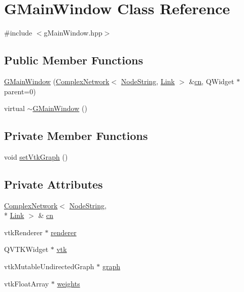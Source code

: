 \hypertarget{class_g_main_window}{\section{G\+Main\+Window Class Reference}
\label{class_g_main_window}
}


{\ttfamily \#include $<$g\+Main\+Window.\+hpp$>$}

\subsection*{Public Member Functions}
\begin{DoxyCompactItemize}
\item 
\hyperlink{class_g_main_window_af189560e487bad8c776083ab79c4b29f}{G\+Main\+Window} (\hyperlink{class_complex_network}{Complex\+Network}$<$ \hyperlink{class_node_string}{Node\+String}, \hyperlink{class_link}{Link} $>$ \&\hyperlink{class_g_main_window_aa5824bd346a8a612ed3792a6ce7faf50}{cn}, Q\+Widget $\ast$parent=0)
\item 
virtual \hyperlink{class_g_main_window_a828128107557ff68eb709fd416b77cb2}{$\sim$\+G\+Main\+Window} ()
\end{DoxyCompactItemize}
\subsection*{Private Member Functions}
\begin{DoxyCompactItemize}
\item 
void \hyperlink{class_g_main_window_a464bcf8c3f6ec788398c275ff4bd800d}{set\+Vtk\+Graph} ()
\end{DoxyCompactItemize}
\subsection*{Private Attributes}
\begin{DoxyCompactItemize}
\item 
\hyperlink{class_complex_network}{Complex\+Network}$<$ \hyperlink{class_node_string}{Node\+String}, \\*
\hyperlink{class_link}{Link} $>$ \& \hyperlink{class_g_main_window_aa5824bd346a8a612ed3792a6ce7faf50}{cn}
\item 
vtk\+Renderer $\ast$ \hyperlink{class_g_main_window_a691d66ce40f6c4782519f50be5e70654}{renderer}
\item 
Q\+V\+T\+K\+Widget $\ast$ \hyperlink{class_g_main_window_a0133dd3a1b89e887ede8aec262844914}{vtk}
\item 
vtk\+Mutable\+Undirected\+Graph $\ast$ \hyperlink{class_g_main_window_ab97c0cde05fda7d301306e82daaeab57}{graph}
\item 
vtk\+Float\+Array $\ast$ \hyperlink{class_g_main_window_a90fc9b6fbd1838ac294c5f00894b1bd7}{weights}
\end{DoxyCompactItemize}


